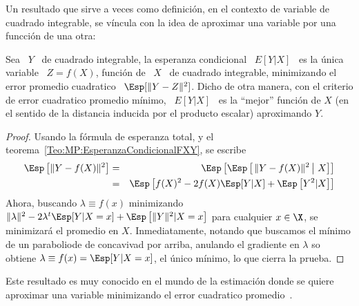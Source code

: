 Un resultado  que  sirve a  veces  como definici\'on,  en  el contexto  de
variable  de  cuadrado integrable,  se  v\'incula con  la  idea  de aproximar  una
variable por una funcci\'on de una otra:
%
\begin{teorema}
  Sea \ $Y$  \ de cuadrado integrable, la esperanza condicional  \ $E[Y|X]$ \ es
  la \'unica variable \ $Z = f(X)$, funci\'on de \ $X$ \ de cuadrado integrable,
  minimizando el error promedio cuadratico \ $\Esp[  \| Y - Z \|^2 ]$.  Dicho de
  otra manera, con el criterio de error cuadratico promedio m\'inimo, \ $E[Y|X]$
  \ es la ``mejor''  funci\'on de $X$ (en el sentido de la distancia inducida por
  el producto escalar) aproximando $Y$.
\end{teorema}
\begin{proof}
  Usando      la      f\'ormula      de      esperanza     total,      y      el
  teorema~\ref{Teo:MP:EsperanzaCondicionalFXY}, se escribe
%
\begin{eqnarray*}
\Esp\left[ \| Y - f(X) \|^2 \right] & = & \Esp\left[ \Esp\left[ \left. \| Y -
f(X) \|^2 \, \right| \, X \right] \right]\\
%
& = & \Esp\left[ f(X)^2 - 2 f(X) \Esp[Y|X] +  \Esp\left[ Y^2 | X \right] \right]
\end{eqnarray*}
%
Ahora, buscando $\lambda \equiv f(x)$  minimizando $\| \lambda\|^2 - 2 \lambda^t
\Esp[Y|X=x] + \Esp\left[ \| Y \|^2 |  X=x \right]$ para cualquier $x \in \X$, se
minimizar\'a  el  promedio en  $X$.   Inmediatamente,  notando  que buscamos  el
m\'inimo de  un paraboliode de concavivad  por arriba, anulando  el gradiente en
$\lambda$ so obtiene  $\lambda \equiv f(x) = \Esp[Y|X=x]$,  el \'unico m\'inimo,
lo que cierra la prueba.
\end{proof}
%
Este resultado  es muy conocido en el  mundo de la estimaci\'on  donde se quiere
aproximar  una variable  minimizando el  error  cuadratico promedio~\cite{Kay93,
  Rob07}.

